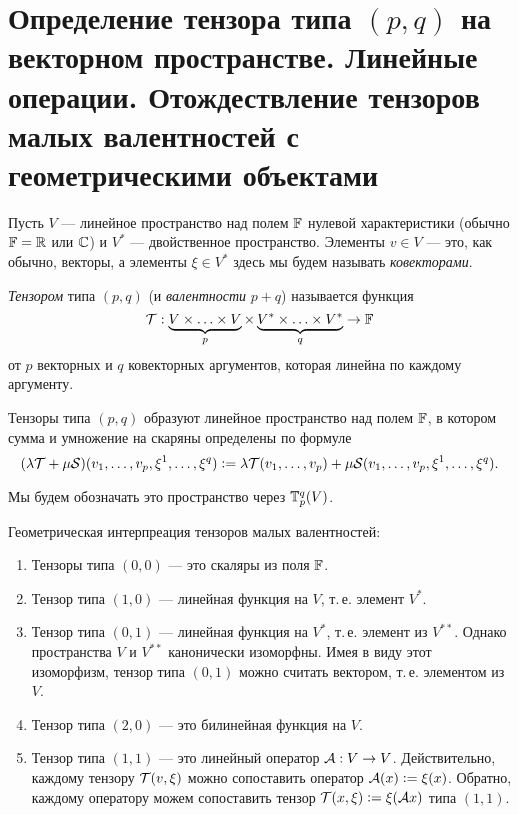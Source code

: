 \section{Определение тензора типа $(p, q)$ на векторном пространстве. Линейные операции. Отождествление тензоров малых валентностей с геометрическими объектами}

Пусть $V$ --- линейное пространство над полем $\mathbb{F}$ нулевой характеристики (обычно $\mathbb{F} = \mathbb{R}$ или $\mathbb{C}$) и $V^\ast$ --- двойственное пространство. Элементы $v \in V$ --- это, как обычно, векторы, а элементы $\xi \in V^\ast$ здесь мы будем называть \textit{ковекторами}.

\begin{definition}
    \textit{Тензором} типа $(p, q)$ (и \textit{валентности} $p + q$) называется функция
    \[
        \mathcal{T}: \underbrace{V \times \ldots \times V}_p \times \underbrace{V^\ast \times \ldots \times V^\ast}_q \to \mathbb{F}
    \]
    от $p$ векторных и $q$ ковекторных аргументов, которая линейна по каждому аргументу.
\end{definition}

Тензоры типа $(p, q)$ образуют линейное пространство над полем $\mathbb{F}$, в котором сумма и умножение на скаряны определены по формуле
\[
    (\lambda\mathcal{T} + \mu\mathcal{S})(v_1, \ldots, v_p, \xi^1, \ldots, \xi^q) \vcentcolon = \lambda\mathcal{T}(v_1, \ldots, v_p) + \mu\mathcal{S}(v_1, \ldots, v_p, \xi^1, \ldots, \xi^q).
\]

Мы будем обозначать это пространство через $\mathbb{T}_p^q(V)$.

\begin{example}
    Геометрическая интерпреация тензоров малых валентностей:
    \begin{enumerate}
        \item Тензоры типа $(0, 0)$ --- это скаляры из поля $\mathbb{F}$.
        \item Тензор типа $(1, 0)$ --- линейная функция на $V$, т.\,е. элемент $V^\ast$.
        \item Тензор типа $(0, 1)$ --- линейная функция на $V^\ast$, т.\,е. элемент из $V^{\ast\ast}$. Однако пространства $V$ и $V^{\ast\ast}$ канонически изоморфны. Имея в виду этот изоморфизм, тензор типа $(0, 1)$ можно считать вектором, т.\,е. элементом из $V$.
        \item Тензор типа $(2, 0)$ --- это билинейная функция на $V$.
        \item Тензор типа $(1, 1)$ --- это линейный оператор $\mathcal{A}: V \to V$. Действительно, каждому тензору $\mathcal{T}(v, \xi)$ можно сопоставить оператор $\mathcal{A}(x) \vcentcolon = \xi(x)$. Обратно, каждому оператору можем сопоставить тензор $\mathcal{T}(x, \xi) \vcentcolon = \xi(\mathcal{A} x)$ типа $(1, 1)$.
    \end{enumerate}
\end{example}


